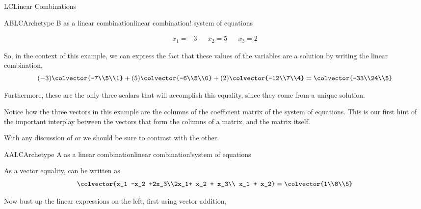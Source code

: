 \begin{subsect}{LC}{Linear Combinations}
\begin{example}{ABLC}{Archetype B as a linear combination}{linear combination! system of equations}
\begin{para}
\begin{align*}
x_1 = -3&&x_2 = 5&&x_3 = 2
\end{align*}\end{para}
%
\begin{para}So, in the context of this example, we can express the fact that these values of the variables are a solution by writing the linear combination,
%
\begin{equation*}
(-3)\colvector{-7\\5\\1}+
(5)\colvector{-6\\5\\0}+
(2)\colvector{-12\\7\\4}
=
\colvector{-33\\24\\5}
\end{equation*}\end{para}
%
\begin{para}Furthermore, these are the only three scalars that will accomplish this equality, since they come from a unique solution.\end{para}
%
\begin{para}Notice how the three vectors in this example are the columns of the coefficient matrix of the system of equations.  This is our first hint of the important interplay between the vectors that form the columns of a matrix, and the matrix itself.\end{para}
\end{example}
%
\begin{para}With any discussion of  or  we should be sure to contrast with the other.\end{para}
%
\begin{example}{AALC}{Archetype A as a linear combination}{linear combination!system of equations}
\begin{para}As a vector equality,  can be written as
%
\begin{equation*}
\colvector{x_1 -x_2 +2x_3\\2x_1+ x_2 + x_3\\ x_1 + x_2}
=
\colvector{1\\8\\5}
\end{equation*}\end{para}
%
\begin{para}Now  bust up the linear expressions on the left, first using vector addition,

\end{para}
\end{example}
\end{subsect}
